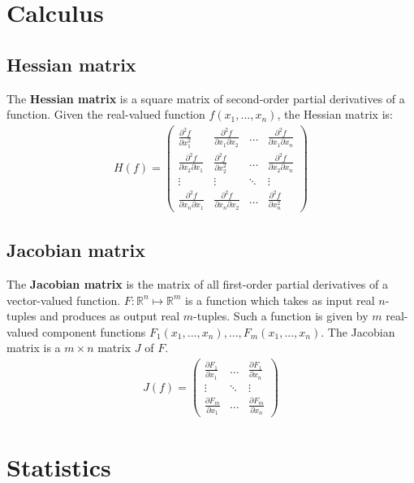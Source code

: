 \documentclass{report}
\begin{document}
\section{Calculus}

\subsection{Hessian matrix}
The {\bf Hessian matrix} is a square matrix of second-order partial derivatives of a function.
Given the real-valued function $f(x_1,...,x_n)$, the Hessian matrix is:
\begin{align*}
H(f) = \begin{pmatrix}
\frac{\partial^2 f}{\partial x_1^2} & \frac{\partial^2 f}{\partial x_1 \partial x_2}  & \dots & \frac{\partial^2 f}{\partial x_1 \partial x_n} \\
\frac{\partial^2 f}{\partial x_2 \partial x_1} & \frac{\partial^2 f}{\partial x_2^2}  & \dots & \frac{\partial^2 f}{\partial x_2 \partial x_n} \\
\vdots & \vdots & \ddots & \vdots \\
\frac{\partial^2 f}{\partial x_n \partial x_1} & \frac{\partial^2 f}{\partial x_n \partial x_2}  & \dots & \frac{\partial^2 f}{\partial x_n^2}
\end{pmatrix}
\end{align*}

\subsection{Jacobian matrix}
The {\bf Jacobian matrix} is the matrix of all first-order partial derivatives of a vector-valued function.
$F : \mathbb{R}^n \mapsto \mathbb{R}^m$ is a function which takes as input real $n$-tuples and produces as output real $m$-tuples.
Such a function is given by $m$ real-valued component functions $F_1(x_1,...,x_n),...,F_m(x_1,...,x_n)$.
The Jacobian matrix is a $m\times n$ matrix $J$ of $F$.
\begin{align*}
J(f) = \begin{pmatrix}
\frac{\partial F_1}{\partial x_1} & \dots & \frac{\partial F_1}{\partial x_n} \\
\vdots & \ddots & \vdots \\
\frac{\partial F_m}{\partial x_1} & \dots & \frac{\partial F_m}{\partial x_n}
\end{pmatrix}
\end{align*}



\section{Statistics}
\end{document}

